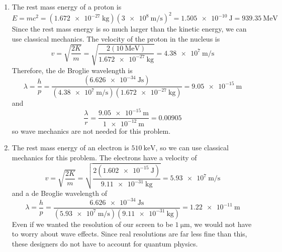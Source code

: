 \documentclass[fleqn]{article}[12pt]
\begin{document}
\begin{enumerate}
\begin{enumerate}
        \item The rest mass energy of a proton is
        \begin{equation*}
            E = mc^2 = (\SI{1.672e-27}{\kg})(\SI{3e8}{\m/\s})^2 = \SI{1.505e-10}{\joule} = \SI{939.35}{\mega\eV}
        \end{equation*}
        Since the rest mass energy is so much larger than the kinetic energy, we can use classical mechanics. The velocity of the proton in the nucleus is
        \begin{equation*}
            v = \sqrt{\frac{2K}{m}} = \sqrt{\frac{2(\SI{10}{\mega\eV})}{\SI{1.672e-27}{\kg}}} = \SI{4.38e7}{\m/\s}
        \end{equation*}
        Therefore, the de Broglie wavelength is
        \begin{equation*}
            \lambda = \frac{h}{p} = \frac{(\SI{6.626e-34}{\joule\s})}{(\SI{4.38e7}{\m/\s})(\SI{1.672e-27}{\kg})} = \SI{9.05e-15}{\m}
        \end{equation*}
        and
        \begin{equation*}
            \frac{\lambda}{r} = \frac{\SI{9.05e-15}{\m}}{\SI{1e-12}{\m}} = 0.00905
        \end{equation*}
        so wave mechanics are not needed for this problem.

        \item The rest mass energy of an electron is $\SI{510}{\kilo\eV}$, so we can use classical mechanics for this problem. The electrons have a velocity of
        \begin{equation*}
            v = \sqrt{\frac{2K}{m}} = \sqrt{\frac{2(\SI{1.602e-15}{\joule})}{\SI{9.11e-31}{\kg}}} = \SI{5.93e7}{\m/\s}
        \end{equation*}
        and a de Broglie wavelength of
        \begin{equation*}
            \lambda  = \frac{h}{p} = \frac{\SI{6.626e-34}{\joule\s}}{(\SI{5.93e7}{\m/\s})(\SI{9.11e-31}{\kg})} = \SI{1.22e-11}{\meter}
        \end{equation*}
        Even if we wanted the resolution of our screen to be $\SI{1}{\micro\meter}$, we would not have to worry about wave effects. Since real resolutions are far less fine than this, these designers do not have to account for quantum physics.
    \end{enumerate}
\end{enumerate}
\end{document}
